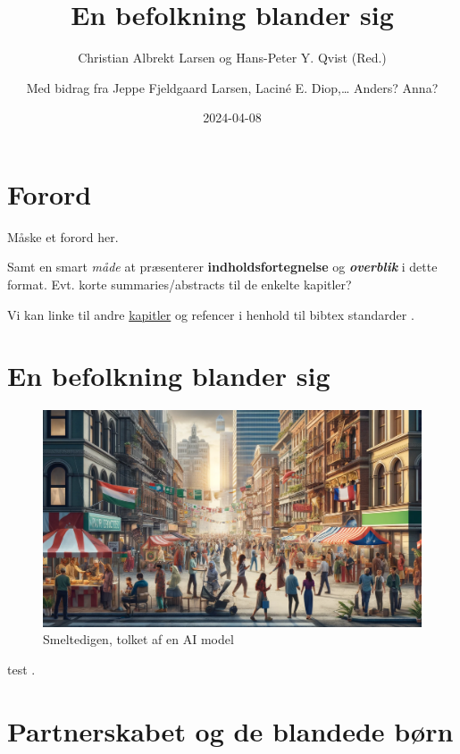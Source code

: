 \documentclass[
]{book}
\title{En befolkning blander sig}
\author{Christian Albrekt Larsen og Hans-Peter Y. Qvist (Red.) \and Med bidrag fra Jeppe Fjeldgaard Larsen, Laciné E. Diop,\ldots{} Anders? Anna?}
\date{2024-04-08}
\begin{document}
\maketitle

{
\setcounter{tocdepth}{1}
\tableofcontents
}
\hypertarget{forord}{%
\chapter*{Forord}\label{forord}}

Måske et forord her.

Samt en smart \emph{måde} at præsenterer \textbf{indholdsfortegnelse} og \textbf{\emph{overblik}} i dette format. Evt. korte summaries/abstracts til de enkelte kapitler?

Vi kan linke til andre \protect\hyperlink{kap1}{kapitler} og refencer i henhold til bibtex standarder \citep{xie2015}.

\hypertarget{kap1}{%
\chapter{En befolkning blander sig}\label{kap1}}

\begin{figure}
\includegraphics[width=24.89in]{images/dalle-smeltedige} \caption{Smeltedigen, tolket af en AI model}\label{fig:fig-smelte}
\end{figure}

test \citep{xie2015}.

\hypertarget{kap2}{%
\chapter{Partnerskabet og de blandede børn}\label{kap2}}
\end{document}
